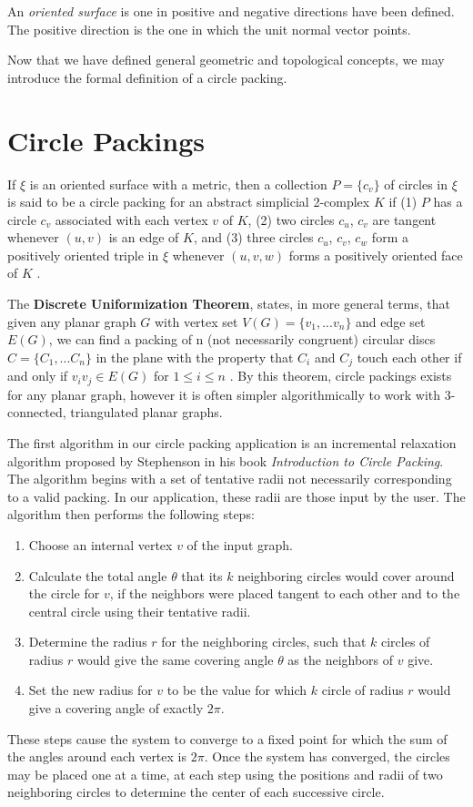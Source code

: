 \documentclass[11pt]{article}
\begin{document}
An \emph{oriented surface} is one in positive and negative directions have been defined. The positive direction is the one in which the unit normal vector points. 

Now that we have defined general geometric and topological concepts, we may introduce the formal definition of a circle packing.

\section{Circle Packings}
If $\xi$ is an oriented surface with a metric, then a collection $P = \{c_v\}$ of circles in $\xi$ is said to be a circle packing for an abstract simplicial 2-complex $K$ if (1) $P$ has a circle $c_v$ associated with each vertex $v$ of $K$, (2) two circles $c_u$, $c_v$ are tangent whenever $(u,v)$ is an edge of $K$, and (3) three circles $c_u$, $c_v$, $c_w$ form a positively oriented triple in $\xi$ whenever $(u,v,w)$ forms a positively oriented face of $K$ \cite{stephenson05introduction}. 

The \textbf{Discrete Uniformization Theorem}, states, in more general terms, that given any planar graph $G$ with vertex set $V(G) = \{v_1, ... v_n \}$ and edge set $E(G)$, we can find a packing of n (not necessarily congruent) circular discs $C= \{C_1,... C_n\}$ in the plane with the property that $C_i$ and $C_j$ touch each other if and only if $v_i v_j \in E(G)$ for $1 \le i \le n$ \cite{stephenson05introduction}.
By this theorem, circle packings exists for any planar graph, however it is often simpler algorithmically to work with 3-connected, triangulated planar graphs.

The first algorithm in our circle packing application is an incremental relaxation algorithm proposed by Stephenson in his book \emph{Introduction to Circle Packing}. The algorithm begins with a set of tentative radii not necessarily corresponding to a valid packing. In our application, these radii are those input by the user. The algorithm then performs the following steps:
	\begin{enumerate}
		\item Choose an internal vertex $v$ of the input graph.
		\item Calculate the total angle $\theta$ that its $k$ neighboring circles would cover around the circle for $v$, if the neighbors were placed tangent to each other and to the central circle using their tentative radii.
		\item Determine the radius $r$ for the neighboring circles, such that $k$ circles of radius $r$ would give the same covering angle $\theta$ as the neighbors of $v$ give.
		\item Set the new radius for $v$ to be the value for which $k$ circle of radius $r$ would give a covering angle of exactly $2\pi$.
	\end{enumerate}
These steps cause the system to converge to a fixed point for which the sum of the angles around each vertex is $2\pi$. Once the system has converged, the circles may be placed one at a time, at each step using the positions and radii of two neighboring circles to determine the center of each successive circle.
\end{document}
